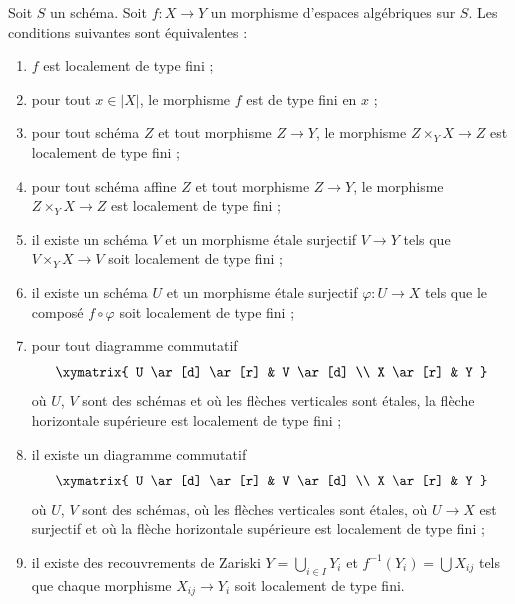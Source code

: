 \begin{lemma}
\label{lemma-finite-type-local}
Soit $S$ un schéma.
Soit $f : X \to Y$ un morphisme d'espaces algébriques sur $S$.
Les conditions suivantes sont équivalentes :
\begin{enumerate}
\item $f$ est localement de type fini ;
\item pour tout $x \in |X|$, le morphisme $f$ est de type fini en $x$ ;
\item pour tout schéma $Z$ et tout morphisme $Z \to Y$, le morphisme
$Z \times_Y X \to Z$ est localement de type fini ;
\item pour tout schéma affine $Z$ et tout morphisme
$Z \to Y$, le morphisme $Z \times_Y X \to Z$ est localement de type fini ;
\item il existe un schéma $V$ et un morphisme étale surjectif
$V \to Y$ tels que $V \times_Y X \to V$ soit localement de type fini ;
\item il existe un schéma $U$ et un morphisme étale surjectif
$\varphi : U \to X$ tels que le composé $f \circ \varphi$
soit localement de type fini ;
\item pour tout diagramme commutatif
$$
\xymatrix{
U \ar[d] \ar[r] & V \ar[d] \\
X \ar[r] & Y
}
$$
où $U$, $V$ sont des schémas et où les flèches verticales sont étales,
la flèche horizontale supérieure est localement de type fini ;
\item il existe un diagramme commutatif
$$
\xymatrix{
U \ar[d] \ar[r] & V \ar[d] \\
X \ar[r] & Y
}
$$
où $U$, $V$ sont des schémas, où les flèches verticales sont étales, où $U \to X$
est surjectif et où la flèche horizontale supérieure est localement de type fini ;
\item il existe des recouvrements de Zariski $Y = \bigcup_{i \in I} Y_i$
et $f^{-1}(Y_i) = \bigcup X_{ij}$ tels que
chaque morphisme $X_{ij} \to Y_i$ soit localement de type fini.
\end{enumerate}
\end{lemma}

